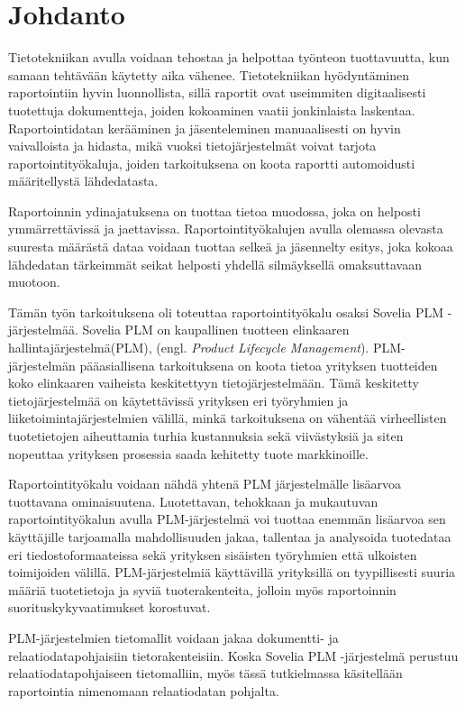 \chapter{Johdanto} \label{Johdanto}

Tietotekniikan avulla voidaan tehostaa ja helpottaa työnteon tuottavuutta, kun samaan tehtävään käytetty aika vähenee. Tietotekniikan hyödyntäminen raportointiin hyvin luonnollista, sillä raportit ovat useimmiten digitaalisesti tuotettuja dokumentteja, joiden kokoaminen vaatii jonkinlaista laskentaa. Raportointidatan kerääminen ja jäsenteleminen manuaalisesti on hyvin vaivalloista ja hidasta, mikä vuoksi tietojärjestelmät voivat tarjota raportointityökaluja, joiden tarkoituksena on koota raportti automoidusti määritellystä lähdedatasta.

Raportoinnin ydinajatuksena on tuottaa tietoa muodossa, joka on helposti ymmärrettävissä ja jaettavissa. Raportointityökalujen avulla olemassa olevasta suuresta määrästä dataa voidaan tuottaa selkeä ja jäsennelty esitys, joka kokoaa lähdedatan tärkeimmät seikat helposti yhdellä silmäyksellä omaksuttavaan muotoon.

Tämän työn tarkoituksena oli toteuttaa raportointityökalu osaksi Sovelia PLM -järjestelmää. Sovelia PLM on kaupallinen tuotteen elinkaaren hallintajärjestelmä(PLM), (engl. \textit{Product Lifecycle Management}). PLM-järjestelmän pääasiallisena tarkoituksena on koota tietoa yrityksen tuotteiden koko elinkaaren vaiheista keskitettyyn tietojärjestelmään. Tämä keskitetty tietojärjestelmää on käytettävissä yrityksen eri työryhmien ja liiketoimintajärjestelmien välillä, minkä tarkoituksena on vähentää virheellisten tuotetietojen aiheuttamia turhia kustannuksia sekä viivästyksiä ja siten nopeuttaa yrityksen prosessia saada kehitetty tuote markkinoille.

Raportointityökalu voidaan nähdä yhtenä PLM järjestelmälle lisäarvoa tuottavana ominaisuutena. Luotettavan, tehokkaan ja mukautuvan raportointityökalun avulla PLM-järjestelmä voi tuottaa enemmän lisäarvoa sen käyttäjille tarjoamalla mahdollisuuden jakaa, tallentaa ja analysoida tuotedataa eri tiedostoformaateissa sekä yrityksen sisäisten työryhmien että ulkoisten toimijoiden välillä. PLM-järjestelmiä käyttävillä yrityksillä on tyypillisesti suuria määriä tuotetietoja ja syviä tuoterakenteita, jolloin myös raportoinnin suorituskykyvaatimukset korostuvat.

PLM-järjestelmien tietomallit voidaan jakaa dokumentti- ja relaatiodatapohjaisiin tietorakenteisiin. \cite{david_what_2016} Koska Sovelia PLM -järjestelmä perustuu relaatiodatapohjaiseen tietomalliin, myös tässä tutkielmassa käsitellään raportointia nimenomaan relaatiodatan pohjalta.

